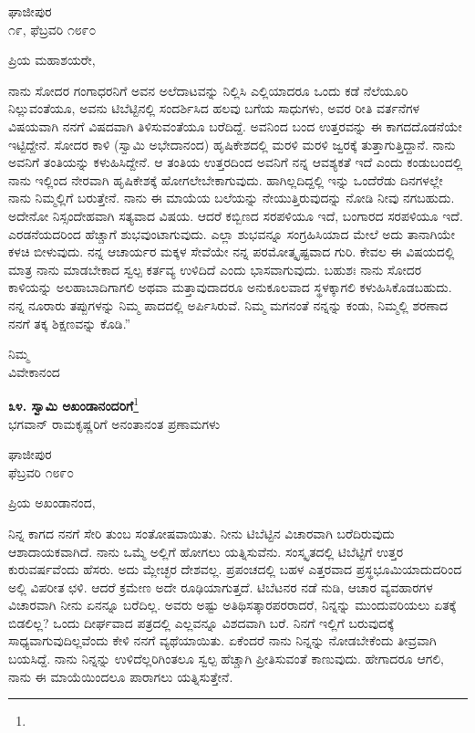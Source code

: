 \begin{flushright}
ಘಾಜೀಪುರ\\೧೯, ಫೆಬ್ರವರಿ ೧೮೯೦
\end{flushright}

\noindent
ಪ್ರಿಯ ಮಹಾಶಯರೇ,

ನಾನು ಸೋದರ ಗಂಗಾಧರನಿಗೆ ಅವನ ಅಲೆದಾಟವನ್ನು ನಿಲ್ಲಿಸಿ ಎಲ್ಲಿಯಾದರೂ ಒಂದು ಕಡೆ ನೆಲೆಯೂರಿ ನಿಲ್ಲುವಂತೆಯೂ, ಅವನು ಟಿಬೆಟ್ಟಿನಲ್ಲಿ ಸಂದರ್ಶಿಸಿದ ಹಲವು ಬಗೆಯ ಸಾಧುಗಳು, ಅವರ ರೀತಿ ವರ್ತನೆಗಳ ವಿಷಯವಾಗಿ ನನಗೆ ವಿಷದವಾಗಿ ತಿಳಿಸುವಂತೆಯೂ ಬರೆದಿದ್ದೆ. ಅವನಿಂದ ಬಂದ ಉತ್ತರವನ್ನು ಈ ಕಾಗದದೊಡನೆಯೇ ಇಟ್ಟಿದ್ದೇನೆ. ಸೋದರ ಕಾಳಿ (ಸ್ವಾಮಿ ಅಭೇದಾನಂದ) ಹೃಷಿಕೇಶದಲ್ಲಿ ಮರಳಿ ಮರಳಿ ಜ್ವರಕ್ಕೆ ತುತ್ತಾಗುತ್ತಿದ್ದಾನೆ. ನಾನು ಅವನಿಗೆ ತಂತಿಯನ್ನು ಕಳುಹಿಸಿದ್ದೇನೆ. ಆ ತಂತಿಯ ಉತ್ತರದಿಂದ ಅವನಿಗೆ ನನ್ನ ಆವಶ್ಯಕತೆ ಇದೆ ಎಂದು ಕಂಡುಬಂದಲ್ಲಿ ನಾನು ಇಲ್ಲಿಂದ ನೇರವಾಗಿ ಹೃಷಿಕೇಶಕ್ಕೆ ಹೋಗಲೇಬೇಕಾಗುವುದು. ಹಾಗಿಲ್ಲದಿದ್ದಲ್ಲಿ ಇನ್ನು ಒಂದೆರೆಡು ದಿನಗಳಲ್ಲೇ ನಾನು ನಿಮ್ಮಲ್ಲಿಗೆ ಬರುತ್ತೇನೆ. ನಾನು ಈ ಮಾಯೆಯ ಬಲೆಯನ್ನು ನೇಯುತ್ತಿರುವುದನ್ನು ನೋಡಿ ನೀವು ನಗಬಹುದು. ಅದೇನೋ ನಿಸ್ಸಂದೇಹವಾಗಿ ಸತ್ಯವಾದ ವಿಷಯ. ಆದರೆ ಕಬ್ಬಿಣದ ಸರಪಳಿಯೂ ಇದೆ, ಬಂಗಾರದ ಸರಪಳಿಯೂ ಇದೆ. ಎರಡನೆಯದರಿಂದ ಹೆಚ್ಚಾಗೆ ಶುಭವುಂಟಾಗುವುದು. ಎಲ್ಲಾ ಶುಭವನ್ನೂ ಸಂಗ್ರಹಿಸಿಯಾದ ಮೇಲೆ ಅದು ತಾನಾಗಿಯೇ ಕಳಚಿ ಬೀಳುವುದು. ನನ್ನ ಆಚಾರ್ಯರ ಮಕ್ಕಳ ಸೇವೆಯೇ ನನ್ನ ಪರಮೋತ್ಕೃಷ್ಟವಾದ ಗುರಿ. ಕೇವಲ ಈ ವಿಷಯದಲ್ಲಿ ಮಾತ್ರ ನಾನು ಮಾಡಬೇಕಾದ ಸ್ವಲ್ಪ ಕರ್ತವ್ಯ ಉಳಿದಿದೆ ಎಂದು ಭಾಸವಾಗುವುದು. ಬಹುಶಃ ನಾನು ಸೋದರ ಕಾಳಿಯನ್ನು ಅಲಹಾಬಾದಿಗಾಗಲಿ ಅಥವಾ ಮತ್ತಾವುದಾದರೂ ಅನುಕೂಲವಾದ ಸ್ಥಳಕ್ಕಾಗಲಿ ಕಳುಹಿಸಿಕೊಡಬಹುದು. ನನ್ನ ನೂರಾರು ತಪ್ಪುಗಳನ್ನು ನಿಮ್ಮ ಪಾದದಲ್ಲಿ ಅರ್ಪಿಸಿರುವೆ. ನಿಮ್ಮ ಮಗನಂತೆ ನನ್ನನ್ನು ಕಂಡು, ನಿಮ್ಮಲ್ಲಿ ಶರಣಾದ ನನಗೆ ತಕ್ಕ ಶಿಕ್ಷಣವನ್ನು ಕೊಡಿ.”

{\flushright
ನಿಮ್ಮ\\ವಿವೇಕಾನಂದ\par}

\newpage

\begin{center}
\textbf{೩೪. ಸ್ವಾಮಿ ಅಖಂಡಾನಂದರಿಗೆ}\footnote{}\\ ಭಗವಾನ್ ರಾಮಕೃಷ್ಣರಿಗೆ ಅನಂತಾನಂತ ಪ್ರಣಾಮಗಳು
\end{center}

\vspace{-0.6cm}


\begin{flushright}
ಘಾಜೀಪುರ\\ಫೆಬ್ರವರಿ ೧೮೯೦
\end{flushright}

\vspace{-0.6cm}

\noindent
ಪ್ರಿಯ ಅಖಂಡಾನಂದ,

ನಿನ್ನ ಕಾಗದ ನನಗೆ ಸೇರಿ ತುಂಬ ಸಂತೋಷವಾಯಿತು. ನೀನು ಟಿಬೆಟ್ಟಿನ ವಿಚಾರವಾಗಿ ಬರೆದಿರುವುದು ಆಶಾದಾಯಕವಾಗಿದೆ. ನಾನು ಒಮ್ಮೆ ಅಲ್ಲಿಗೆ ಹೋಗಲು ಯತ್ನಿಸುವೆನು. ಸಂಸ್ಕೃತದಲ್ಲಿ ಟಿಬೆಟ್ಟಿಗೆ ಉತ್ತರ ಕುರುವರ್ಷವೆಂದು ಹೆಸರು. ಅದು ಮ್ಲೇಚ್ಛರ ದೇಶವಲ್ಲ. ಪ್ರಪಂಚದಲ್ಲಿ ಬಹಳ ಎತ್ತರವಾದ ಪ್ರಸ್ಥಭೂಮಿಯಾದುದರಿಂದ ಅಲ್ಲಿ ವಿಪರೀತ ಛಳಿ. ಆದರೆ ಕ್ರಮೇಣ ಅದೇ ರೂಢಿಯಾಗುತ್ತದೆ. ಟಿಬೆಟನರ ನಡೆ ನುಡಿ, ಆಚಾರ ವ್ಯವಹಾರಗಳ ವಿಚಾರವಾಗಿ ನೀನು ಏನನ್ನೂ ಬರೆದಿಲ್ಲ. ಅವರು ಅಷ್ಟು ಅತಿಥಿಸತ್ಕಾರಪರರಾದರೆ, ನಿನ್ನನ್ನು ಮುಂದುವರಿಯಲು ಏತಕ್ಕೆ ಬಿಡಲಿಲ್ಲ? ಒಂದು ದೀರ್ಘವಾದ ಪತ್ರದಲ್ಲಿ ಎಲ್ಲವನ್ನೂ ವಿಶದವಾಗಿ ಬರೆ. ನಿನಗೆ ಇಲ್ಲಿಗೆ ಬರುವುದಕ್ಕೆ ಸಾಧ್ಯವಾಗುವುದಿಲ್ಲವೆಂದು ಕೇಳಿ ನನಗೆ ವ್ಯಥೆಯಾಯಿತು. ಏಕೆಂದರೆ ನಾನು ನಿನ್ನನ್ನು ನೋಡಬೇಕೆಂದು ತೀವ್ರವಾಗಿ ಬಯಸಿದ್ದೆ. ನಾನು ನಿನ್ನನ್ನು ಉಳಿದೆಲ್ಲರಿಗಿಂತಲೂ ಸ್ವಲ್ಪ ಹೆಚ್ಚಾಗಿ ಪ್ರೀತಿಸುವಂತೆ ಕಾಣುವುದು. ಹೇಗಾದರೂ ಆಗಲಿ, ನಾನು ಈ ಮಾಯೆಯಿಂದಲೂ ಪಾರಾಗಲು ಯತ್ನಿಸುತ್ತೇನೆ.

